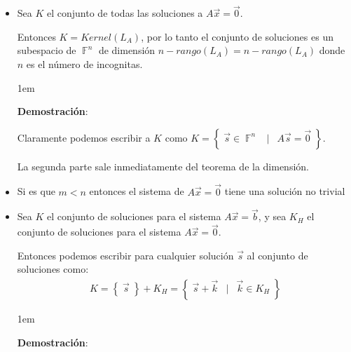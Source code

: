\documentclass[12pt, fleqn]{report}                             %
\newenvironment{SmallIndentation}[1][0.75em]                    %
        {\begin{adjustwidth}{#1}{}\begin{footnotesize}}             %
        {\end{footnotesize}\end{adjustwidth}}                       %
\DeclareMathOperator \Space     {\quad}                         %
\DeclareMathOperator \MiniSpace {\;}                            %
\newcommand \Such           {\MiniSpace | \MiniSpace}           %
\theoremstyle{break}                                            %
\DeclareMathOperator \GenericField {\mathbb{F}}                 %
\newcommand{\Set}[1]            {\left\{ \; #1 \; \right\}}     %
\begin{document}
                    \begin{itemize}
                        \item 
                            Sea $K$ el conjunto de todas las soluciones a $A \vec x = \vec 0$.

                            Entonces $K = Kernel(L_A)$, por lo tanto el conjunto de soluciones es un subespacio
                            de $\GenericField^n$ de dimensión $n - rango(L_A) = n - rango(L_A)$ donde $n$ es el 
                            número de incognitas.

                            \begin{SmallIndentation}[1em]
                                \textbf{Demostración}:
                                
                                Claramente podemos escribir a $K$ como $K = \Set{\vec s \in \GenericField^n \Such A \vec s = \vec 0}$.

                                La segunda parte sale inmediatamente del teorema de la dimensión.
                            
                            \end{SmallIndentation}

                        \item
                            Si es que $m < n$ entonces el sistema de $A \vec x = \vec 0$ tiene una solución no trivial

                        \item
                            Sea $K$ el conjunto de soluciones para el sistema $A \vec x = \vec b$, y sea
                            $K_H$ el conjunto de soluciones para el sistema $A \vec x = \vec 0$.

                            Entonces podemos escribir para cualquier solución $\vec s$ al conjunto de soluciones
                            como:
                            \begin{align*}
                                K = \Set{\vec s} + K_H
                                  = \Set{\vec s + \vec k \Such \vec k \in K_H}
                            \end{align*}

                            \begin{SmallIndentation}[1em]
                                \textbf{Demostración}:
                                

\end{SmallIndentation}
\end{itemize}
\end{document}
